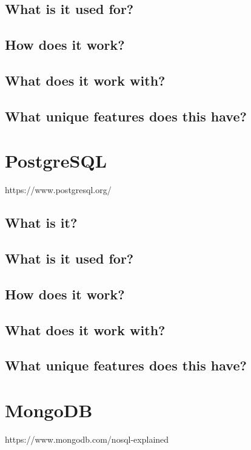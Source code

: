 \section{What is it used for?}

\section{How does it work?}

\section{What does it work with?}

\section{What unique features does this have?}


\chapter{PostgreSQL}
https://www.postgresql.org/

\section{What is it?}

\section{What is it used for?}

\section{How does it work?}

\section{What does it work with?}

\section{What unique features does this have?}


\chapter{MongoDB}
https://www.mongodb.com/nosql-explained

